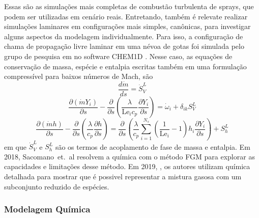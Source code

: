 Essas são as simulações mais completas de combustão turbulenta de sprays, que podem ser utilizadas em cenário reais.%
Entretando, também é relevate realizar simulações laminares em configurações mais simples, canônicas, para investigar alguns aspectos da modelagem individualmente. 
Para isso, a configuração de chama de propagação livre laminar em uma névoa de gotas foi simulada pelo grupo de pesquisa em \cite{SacomanoF2018CTM, SacomanoF2019IJHMT} no software CHEM1D \cite{Sommers1994PhD}.
Nesse caso, as equações de conservação de massa, espécie e entalpia escritas também em uma formulação compressível para baixos números de Mach, são \cite{SacomanoF2018CTM,SacomanoF2021Fluids,vanOijen2002CTM,vanOijen2016PECS}
\begin{equation}
    \frac{d \dot m}{d s} = \dot S_V^L
\end{equation}
\begin{equation}
    \frac{\partial(\dot m Y_i)}{\partial s} -
    \frac{\partial}{\partial s} \left(
        \frac{\lambda}{\mathrm{Le}_i c_p} \frac{\partial Y_i}{\partial s}
    \right) =
    \dot \omega_i + \delta_{ik}S_V^L
\end{equation}
\begin{equation}
    \frac{\partial(\dot m h)}{\partial s}
    -
    \frac{\partial}{\partial s} \left(\frac{\lambda}{c_p} \frac{\partial h}{\partial s} \right)
    =
    \frac{\partial}{\partial s} \left(
            \frac{\lambda}{c_p}\sum_{i=1}^{N_s}
            \left(\frac{1}{\mathrm{Le}_i}-1\right)
            h_i \frac{\partial Y_i}{\partial s} 
        \right)
        +
    S_h^L
\end{equation}
em que $\dot S_V^L$ e $S_h^L$ são os termos de acoplamento de fase de massa e entalpia.
Em 2018, Sacomano~et.~al \cite{SacomanoF2018CTM} resolvem a química com o método FGM para explorar as capacidades e limitações desse método.
Em 2019, \cite{SacomanoF2019IJHMT}, os autores utilizam química detalhada para mostrar que é possivel representar a mistura gasosa com um subconjunto reduzido de espécies.  


\subsubsection{Modelagem Química} \label{sec:chem}

